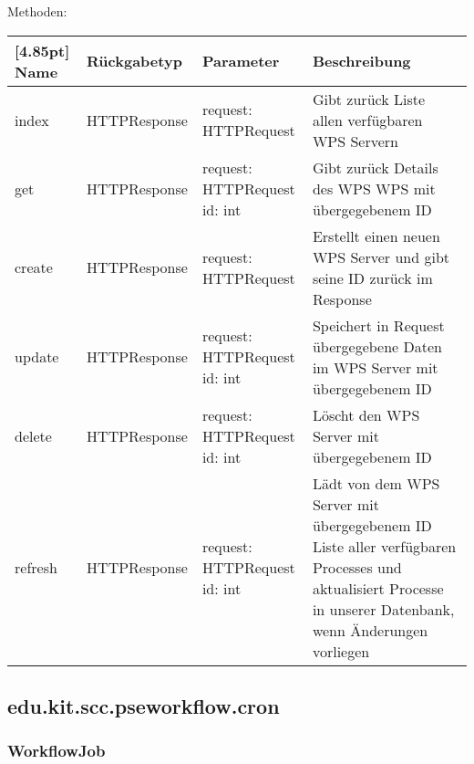 		Methoden:
		\begin{center}
		    \setlength\tabcolsep{5pt}
        	\renewcommand{\arraystretch}{1.5}
            	\begin{tabularx}{\textwidth}{|l|l|l|X|}
            	\hline
            	\rowcolor[gray]{0.75}[4.85pt]
        		Name & Rückgabetyp & Parameter & Beschreibung \\ \hline 
                index & HTTPResponse & request: HTTPRequest & Gibt zurück Liste allen verfügbaren WPS Servern \\ \hline
                get & HTTPResponse & \thead{request: HTTPRequest\\id: int} & Gibt zurück Details des WPS WPS mit übergegebenem ID \\ \hline
                create & HTTPResponse & request: HTTPRequest & Erstellt einen neuen WPS Server und gibt seine ID zurück im Response \\ \hline
                update& HTTPResponse & \thead{request: HTTPRequest\\id: int} & Speichert in Request übergegebene Daten im WPS Server mit übergegebenem ID \\ \hline
                delete & HTTPResponse & \thead{request: HTTPRequest\\id: int} & Löscht den WPS Server mit übergegebenem ID \\ \hline
                refresh & HTTPResponse & \thead{request: HTTPRequest\\id: int} & Lädt von dem WPS Server mit übergegebenem ID Liste aller verfügbaren Processes und aktualisiert Processe in unserer Datenbank, wenn Änderungen vorliegen \\ \hline
            	\end{tabularx}
		\end{center}

    \subsection{edu.kit.scc.pseworkflow.cron}

		\subsubsection{WorkflowJob}

